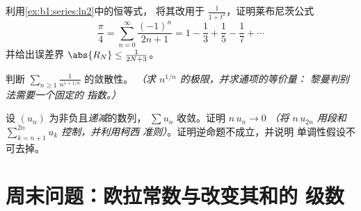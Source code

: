 \begin{exercise}[$\star\star\star$]\label{exo:b1:series:10}
利用\cref{ex:b1:series:ln2}中的恒等式，
将其改用于 $\frac{1}{1+t^2}$，证明莱布尼茨公式
\[
\frac{\pi}{4} = \sum_{n=0}^{\infty} \frac{(-1)^n}{2n+1}
= 1 - \frac13 + \frac15 - \frac17 + \cdots
\]
并给出误差界 $\abs{R_N} \leq \frac{1}{2N+3}$。
\end{exercise}

\begin{exercise}[$\star\star$]\label{exo:b1:series:11}
判断 $\displaystyle\sum_{n \geq 1} \frac{1}{n^{1 + 1/n}}$ 的敛散性。
\emph{（求 $n^{1/n}$ 的极限，并求通项的等价量：
黎曼判别法需要一个\emph{固定}的
指数。）}
\end{exercise}

\begin{exercise}[$\star\star\star$]\label{exo:b1:series:12}
设 $(u_n)$ 为非负且\emph{递减}的数列， $\sum u_n$
收敛。证明 $n\,u_n \to 0$ \emph{（将 $n\,u_{2n}$
用段和 $\sum_{k=n+1}^{2n} u_k$ 控制，并利用柯西
准则）}。证明逆命题不成立，并说明
单调性假设不可去掉。
\end{exercise}

\section{周末问题：欧拉常数与改变其和的
级数}

